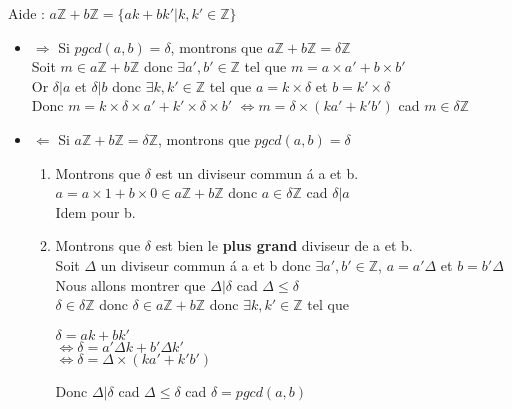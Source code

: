 \begin{myproof}[D\'emonstration :]
Aide : $a\mathbb{Z}+b\mathbb{Z}=\{ak + bk' | k, k' \in \mathbb{Z}\}$
\begin{itemize}[label=\textbullet]
	\item $\Rightarrow$ Si $pgcd(a,b)= \delta$, montrons que 
	$a\mathbb{Z}+b\mathbb{Z}=\delta \mathbb{Z}$\\
	Soit $m\in a\mathbb{Z}+b\mathbb{Z}$ donc 
	$\exists a', b' \in \mathbb{Z}$ tel que $m=a\times a'+ b \times b'$ \\
	Or $\delta|a$ et $\delta|b$ donc $\exists k, k' \in \mathbb{Z}$
	tel que $a=k\times \delta$ et $b=k'\times \delta$ \\
	Donc $m=k\times \delta \times a' + k' \times \delta \times b'$
	$\Leftrightarrow m=\delta \times (ka'+k'b')$ cad $m \in \delta \mathbb{Z}$

	\item $\Leftarrow$ Si $a\mathbb{Z}+b\mathbb{Z}=\delta \mathbb{Z}$,
	montrons que $pgcd(a,b)=\delta$
	\begin{enumerate}
		\item Montrons que $\delta$ est un diviseur commun \'a a et b.\\
		$a = a \times 1 + b \times 0 \in a\mathbb{Z}+b\mathbb{Z}$ donc $a \in \delta \mathbb{Z}$ cad $\delta | a$ \\
		Idem pour b.
		\item Montrons que $\delta$ est bien le \textbf{plus grand} diviseur de a et b. \\
		Soit $\Delta$ un diviseur commun \'a a et b donc $\exists a', b' \in \mathbb{Z}$, $a=a'\Delta$ et $b=b'\Delta$\\
	 	Nous allons montrer que $\Delta | \delta$ cad $\Delta \le \delta$ \\
		$\delta \in \delta \mathbb{Z}$ donc $\delta \in a\mathbb{Z}+b\mathbb{Z}$ 
		donc $\exists k, k' \in \mathbb{Z}$ tel que  
		\begin{tabbing}
		\hspace{0.4cm} $\delta = ak + bk'$ \\
		$\Leftrightarrow \delta = a' \Delta k+b' \Delta k'$ \\
		$ \Leftrightarrow \delta = \Delta \times (ka'+k'b')$\\ 
		\end{tabbing}
		Donc $\Delta | \delta$ cad $\Delta \le \delta$ 
		cad $\delta = pgcd(a,b)$
	\end{enumerate}
\end{itemize}
\end{myproof}



